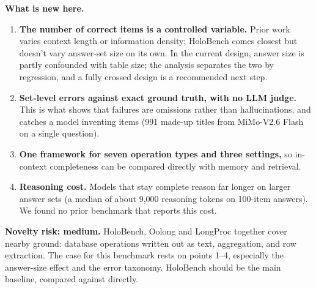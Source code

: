 \documentclass[10pt]{article}
\begin{document}
\textbf{What is new here.}
\begin{enumerate}
\item \textbf{The number of correct items is a controlled variable.} Prior work varies context length or
information density; HoloBench comes closest but doesn't vary answer-set size on its own. In the current design,
answer size is partly confounded with table size; the analysis separates the two by regression, and a fully
crossed design is a recommended next step.
\item \textbf{Set-level errors against exact ground truth, with no LLM judge.} This is what shows that failures are
omissions rather than hallucinations, and catches a model inventing items (991 made-up titles from MiMo-V2.6
Flash on a single question).
\item \textbf{One framework for seven operation types and three settings,} so in-context completeness can be
compared directly with memory and retrieval.
\item \textbf{Reasoning cost.} Models that stay complete reason far longer on larger answer sets (a median of about
9,000 reasoning tokens on 100-item answers). We found no prior benchmark that reports this cost.
\end{enumerate}

\textbf{Novelty risk: medium.} HoloBench, Oolong and LongProc together cover nearby ground: database operations
written out as text, aggregation, and row extraction. The case for this benchmark rests on points 1--4,
especially the answer-size effect and the error taxonomy. HoloBench should be the main baseline, compared against
directly.
\end{document}
